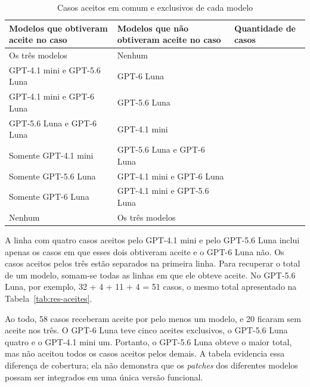 \begin{table}[H]
\centering
\begin{SingleSpace}
\small
\setlength{\tabcolsep}{4pt}
\renewcommand{\arraystretch}{1.3}
\caption{Casos aceitos em comum e exclusivos de cada modelo}
\label{tab:res-sobreposicao}
\begin{tabularx}{\textwidth}{>{\raggedright\arraybackslash}p{}>{\raggedright\arraybackslash}X>{\centering\arraybackslash}X}
\toprule
\textbf{Modelos que obtiveram aceite no caso} & \textbf{Modelos que não obtiveram aceite no caso} & \textbf{Quantidade de casos} \\
\midrule
Os três modelos & Nenhum & 32 \\
GPT-4.1 mini e GPT-5.6 Luna & GPT-6 Luna & 4 \\
GPT-4.1 mini e GPT-6 Luna & GPT-5.6 Luna & 1 \\
GPT-5.6 Luna e GPT-6 Luna & GPT-4.1 mini & 11 \\
Somente GPT-4.1 mini & GPT-5.6 Luna e GPT-6 Luna & 1 \\
Somente GPT-5.6 Luna & GPT-4.1 mini e GPT-6 Luna & 4 \\
Somente GPT-6 Luna & GPT-4.1 mini e GPT-5.6 Luna & 5 \\
Nenhum & Os três modelos & 20 \\
\bottomrule
\end{tabularx}
\end{SingleSpace}
\end{table}

A linha com quatro casos aceitos pelo GPT-4.1 mini e pelo GPT-5.6 Luna inclui apenas os casos em que esses dois obtiveram aceite e o GPT-6 Luna não. Os casos aceitos pelos três estão separados na primeira linha. Para recuperar o total de um modelo, somam-se todas as linhas em que ele obteve aceite. No GPT-5.6 Luna, por exemplo, 32 + 4 + 11 + 4 = 51 casos, o mesmo total apresentado na Tabela~\ref{tab:res-aceites}.

Ao todo, 58 casos receberam aceite por pelo menos um modelo, e 20 ficaram sem aceite nos três. O GPT-6 Luna teve cinco aceites exclusivos, o GPT-5.6 Luna quatro e o GPT-4.1 mini um. Portanto, o GPT-5.6 Luna obteve o maior total, mas não aceitou todos os casos aceitos pelos demais. A tabela evidencia essa diferença de cobertura; ela não demonstra que os \textit{patches} dos diferentes modelos possam ser integrados em uma única versão funcional.

